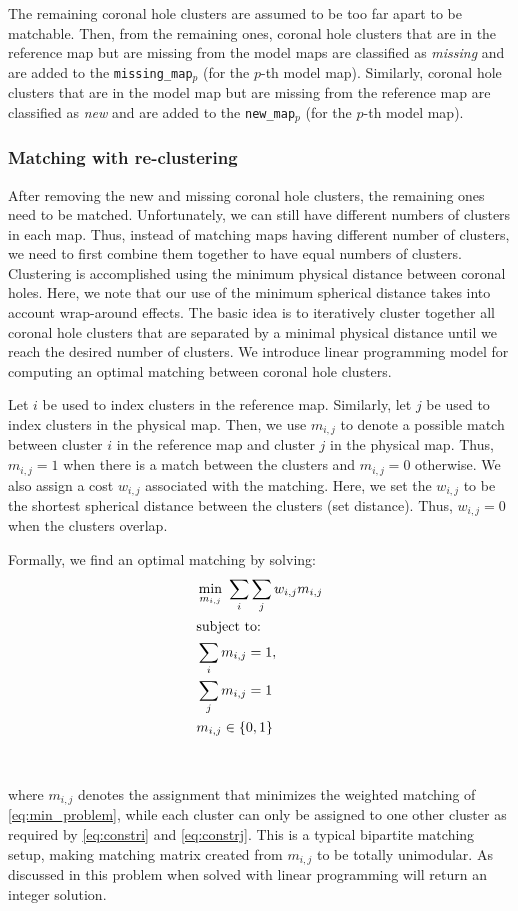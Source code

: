 \documentclass[journal]{IEEEtran}
\begin{document}
The remaining coronal hole clusters are assumed to be too far apart to be matchable.
Then, from the remaining ones, coronal hole clusters that are in the reference map but are missing from the model maps are classified as \textit{missing} and are added to the {\tt missing\_map$_p$} (for the $p$-th model map).
Similarly, coronal hole clusters that are in the model map but are missing from the reference map are classified as \textit{new} and are added to the  {\tt new\_map$_p$} (for the $p$-th model map).

\subsubsection{Matching with re-clustering}\label{sec:ch4Matching}
After removing the new and missing coronal hole clusters, the 
remaining ones need to be matched. Unfortunately, we
can still have different numbers of clusters in each map.
Thus, instead of matching  maps having different number
of clusters, we need to first combine them
together to have equal numbers of clusters. Clustering
is accomplished using the minimum physical distance between coronal holes.
\color{blue}
Here, we note that our use of the minimum spherical distance takes
   into account wrap-around effects.
\color{black}
The basic idea is to iteratively cluster together all
coronal hole clusters that are separated by a minimal
physical distance until we reach the desired number of
clusters. We introduce linear programming model for
computing an optimal matching between coronal hole clusters.

Let $i$ be used to index clusters in the reference map.
Similarly, let $j$ be used to index clusters in the physical map.
Then, we use  $m_{i,j}$
to denote a possible match between cluster $i$ in the reference map
and cluster $j$ in the physical map.
Thus, $m_{i,j}=1$ when there is a match between the clusters
and $m_{i,j}=0$ otherwise.
We also assign a cost $w_{i,j}$ associated with the matching.
Here, we set the $w_{i,j}$ to be the shortest spherical distance
between the clusters (set distance).
Thus, $w_{i,j}=0$ when the clusters overlap.

Formally, we find an optimal matching by solving:
\begin{align}
 &\min_{m_{i,j}} \,\, \sum_i \sum_j w_{i,j} m_{i, j} 
\label{eq:min_problem} \\
\intertext{subject to:}          
&\sum_i m_{i, j} = 1, \label{eq:constri} \\
&\sum_j m_{i, j} = 1  \label{eq:constrj}\\
&m_{i, j} \in \{0, 1\} 
\end{align}\\
\\
where $m_{i, j}$ denotes the assignment that minimizes
the weighted matching of \eqref{eq:min_problem},
while each cluster can only be assigned to one
other cluster as required by \eqref{eq:constri} and \eqref{eq:constrj}.
This is a typical bipartite matching setup, making matching matrix
created from $m_{i,j}$ to be totally unimodular. As discussed in
\cite{papadimitriou1982combinatorial} this problem when solved with
linear programming will return an integer solution.
\end{document}
